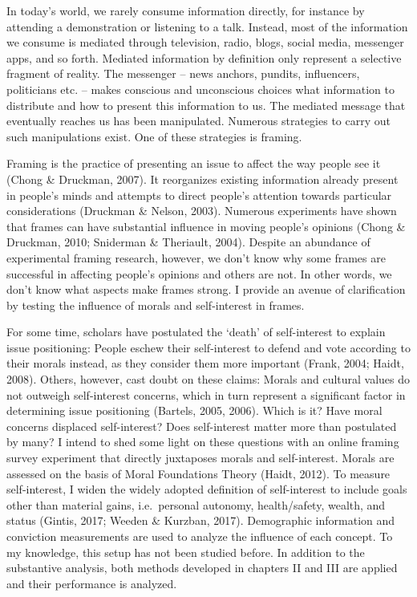 \documentclass[12pt,econ]{sources/authesis}
\begin{document}
In today's world, we rarely consume information directly, for instance by attending a demonstration or listening to a talk. Instead, most of the information we consume is mediated through television, radio, blogs, social media, messenger apps, and so forth. Mediated information by definition only represent a selective fragment of reality. The messenger -- news anchors, pundits, influencers, politicians etc. -- makes conscious and unconscious choices what information to distribute and how to present this information to us. The mediated message that eventually reaches us has been manipulated. Numerous strategies to carry out such manipulations exist. One of these strategies is framing.

Framing is the practice of presenting an issue to affect the way people see it (Chong \& Druckman, 2007). It reorganizes existing information already present in people's minds and attempts to direct people's attention towards particular considerations (Druckman \& Nelson, 2003). Numerous experiments have shown that frames can have substantial influence in moving people's opinions (Chong \& Druckman, 2010; Sniderman \& Theriault, 2004). Despite an abundance of experimental framing research, however, we don't know why some frames are successful in affecting people's opinions and others are not. In other words, we don't know what aspects make frames strong. I provide an avenue of clarification by testing the influence of morals and self-interest in frames.

For some time, scholars have postulated the `death' of self-interest to explain issue positioning: People eschew their self-interest to defend and vote according to their morals instead, as they consider them more important (Frank, 2004; Haidt, 2008). Others, however, cast doubt on these claims: Morals and cultural values do not outweigh self-interest concerns, which in turn represent a significant factor in determining issue positioning (Bartels, 2005, 2006). Which is it? Have moral concerns displaced self-interest? Does self-interest matter more than postulated by many? I intend to shed some light on these questions with an online framing survey experiment that directly juxtaposes morals and self-interest. Morals are assessed on the basis of Moral Foundations Theory (Haidt, 2012). To measure self-interest, I widen the widely adopted definition of self-interest to include goals other than material gains, i.e.~personal autonomy, health/safety, wealth, and status (Gintis, 2017; Weeden \& Kurzban, 2017). Demographic information and conviction measurements are used to analyze the influence of each concept. To my knowledge, this setup has not been studied before. In addition to the substantive analysis, both methods developed in chapters II and III are applied and their performance is analyzed.
\end{document}
